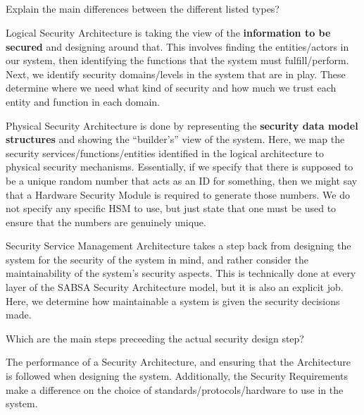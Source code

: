 \begin{questions}
  \begin{parts}
  \part{} Explain the main differences between the different listed types?
    \begin{solution}
      Logical Security Architecture is taking the view of the \textbf{information to be secured} and designing around that.
      This involves finding the entities/actors in our system, then identifying the functions that the system must fulfill/perform.
      Next, we identify security domains/levels in the system that are in play.
      These determine where we need what kind of security and how much we trust each entity and function in each domain.

      Physical Security Architecture is done by representing the \textbf{security data model structures} and showing the ``builder's'' view of the system.
      Here, we map the security services/functions/entities identified in the logical architecture to physical security mechanisms.
      Essentially, if we specify that there is supposed to be a unique random number that acts as an ID for something, then we might say that a Hardware Security Module is required to generate those numbers.
      We do not specify any specific HSM to use, but just state that one must be used to ensure that the numbers are genuinely unique.

      Security Service Management Architecture takes a step back from designing the system for the security of the system in mind, and rather consider the maintainability of the system's security aspects.
      This is technically done at every layer of the SABSA Security Architecture model, but it is also an explicit job.
      Here, we determine how maintainable a system is given the security decisions made.
    \end{solution}
  \end{parts}

\question{} Which are the main steps preceeding the actual security design step?
  \begin{solution}
    The performance of a Security Architecture, and ensuring that the Architecture is followed when designing the system.
    Additionally, the Security Requirements make a difference on the choice of standards/protocols/hardware to use in the system.
  \end{solution}


\end{questions}
